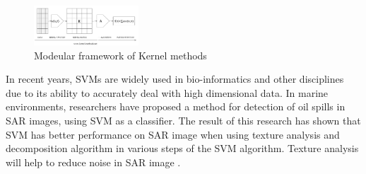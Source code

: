 
\begin{figure}[H]
	\centering
    \includegraphics[width=0.35\textwidth]{./img/kernel1.png}
     \caption{\footnotesize{Modeular framework of Kernel methods }}
    \label{fig:Kernel}
\end{figure} 



In recent years, SVMs are widely used in bio-informatics \cite{furey2000support,osuna1997training,guyon2002gene} and other disciplines due to its ability to accurately deal with high dimensional data\cite{joachims1998text}. In marine environments, researchers have proposed a method for detection of oil spills in SAR images, using SVM  as a classifier. The result of this research has shown that SVM has better performance on SAR image when using texture analysis and decomposition algorithm in various steps of the SVM algorithm. Texture analysis will help to reduce noise in SAR image \cite{matkan2013oil}.




